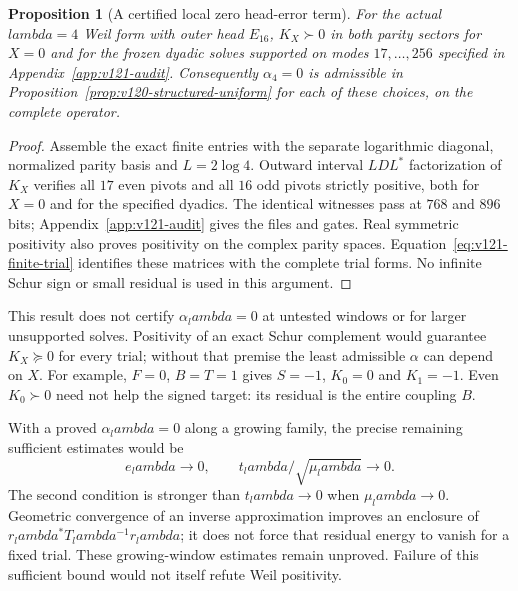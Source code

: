 \documentclass[11pt]{article}
\def\lambda{lambda}%
\newtheorem{proposition}[theorem]{Proposition}
\theoremstyle{remark}
\begin{document}
\begin{proposition}[A certified local zero head-error term]
\label{prop:v121-alpha-zero}
For the actual $\lambda=4$ Weil form with outer head $E_{16}$,
$K_X\succ0$ in both parity sectors for $X=0$ and for the frozen
dyadic solves supported on modes $17,\ldots,256$ specified in
Appendix~\ref{app:v121-audit}. Consequently $\alpha_4=0$ is
admissible in Proposition~\ref{prop:v120-structured-uniform} for
each of these choices, on the complete operator.
\end{proposition}
\begin{proof}
Assemble the exact finite entries with the separate logarithmic
diagonal, normalized parity basis and $L=2\log4$. Outward interval
$LDL^*$ factorization of $K_X$ verifies all $17$ even pivots and
all $16$ odd pivots strictly positive, both for $X=0$ and for the
specified dyadics. The identical witnesses pass at $768$ and $896$
bits; Appendix~\ref{app:v121-audit} gives the files and gates.
Real symmetric positivity also proves positivity on the complex
parity spaces. Equation~\eqref{eq:v121-finite-trial} identifies these
matrices with the complete trial forms. No infinite Schur sign or
small residual is used in this argument.
\end{proof}

This result does not certify $\alpha_\lambda=0$ at untested windows
or for larger unsupported solves. Positivity of an exact Schur
complement would guarantee $K_X\succeq0$ for every trial; without
that premise the least admissible $\alpha$ can depend on $X$.
For example, $F=0$, $B=T=1$ gives $S=-1$, $K_0=0$ and $K_1=-1$.
Even $K_0\succ0$ need not help the signed target: its residual is
the entire coupling $B$.

With a proved $\alpha_\lambda=0$ along a growing family, the precise
remaining sufficient estimates would be
\begin{equation}\label{eq:v121-scaled-target}
 e_\lambda\longrightarrow0,
 \qquad t_\lambda/\sqrt{\mu_\lambda}\longrightarrow0.
\end{equation}
The second condition is stronger than $t_\lambda\to0$ when
$\mu_\lambda\to0$. Geometric convergence of an inverse approximation
improves an enclosure of $r_\lambda^*T_\lambda^{-1}r_\lambda$;
it does not force that residual energy to vanish for a fixed trial.
These growing-window estimates remain unproved. Failure of this
sufficient bound would not itself refute Weil positivity.
\end{document}
